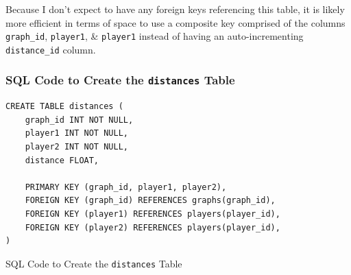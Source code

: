 \documentclass[a4paper,11pt]{article}
\newenvironment{code}{\captionsetup{type=listing}}{}
\begin{document}
Because I don't expect to have any foreign keys referencing this table, it is likely more efficient in terms of space to use a composite key comprised of the columns \texttt{graph_id},
\texttt{player1}, \& \texttt{player1} instead of having an auto-incrementing \texttt{distance_id} column.

\subsubsection{SQL Code to Create the \texttt{distances} Table}
\begin{code}
\begin{verbatim}
CREATE TABLE distances (
    graph_id INT NOT NULL,
    player1 INT NOT NULL,
    player2 INT NOT NULL,
    distance FLOAT,

    PRIMARY KEY (graph_id, player1, player2),
    FOREIGN KEY (graph_id) REFERENCES graphs(graph_id),
    FOREIGN KEY (player1) REFERENCES players(player_id),
    FOREIGN KEY (player2) REFERENCES players(player_id),
)
\end{verbatim}
\caption{SQL Code to Create the \texttt{distances} Table}
\end{code}
\end{document}
